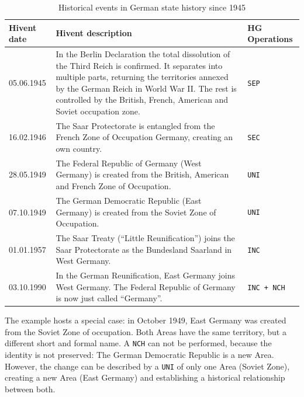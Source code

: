 \begin{table}[H]
\begin{center}
\begin{tabular}{l p{8.5cm} l}
  \toprule
  Hivent date & Hivent description & HG Operations \\
  \midrule

    05.06.1945
  & \footnotesize{In the Berlin Declaration the total dissolution of the Third Reich is confirmed. It separates into multiple parts, returning the territories annexed by the German Reich in World War II. The rest is controlled by the British, French, American and Soviet occupation zone.}
  & \texttt{SEP} \\

    16.02.1946
  & \footnotesize{The Saar Protectorate is entangled from the French Zone of Occupation Germany, creating an own country.}
  & \texttt{SEC} \\

    28.05.1949
  & \footnotesize{The Federal Republic of Germany (West Germany) is created from the British, American and French Zone of Occupation.}
  & \texttt{UNI} \\

    07.10.1949
  & \footnotesize{The German Democratic Republic (East Germany) is created from the Soviet Zone of Occupation.}
  & \texttt{UNI} \\

    01.01.1957
  & \footnotesize{The Saar Treaty (``Little Reunification'') joins the Saar Protectorate as the Bundesland Saarland in West Germany.}
  & \texttt{INC} \\

    03.10.1990
  & \footnotesize{In the German Reunification, East Germany joins West Germany. The Federal Republic of Germany is now just called ``Germany''.}
  & \texttt{INC + NCH} \\

  \bottomrule
\end{tabular}
\caption{Historical events in German state history since 1945}
\label{tab:german_history_since_1945}
\end{center}
\end{table}

The example hosts a special case: in October 1949, East Germany was created from the Soviet Zone of occupation. Both Areas have the same territory, but a different short and formal name. A \texttt{NCH} can not be performed, because the identity is not preserved: The German Democratic Republic is a new Area. However, the change can be described by a \texttt{UNI} of only one Area (Soviet Zone), creating a new Area (East Germany) and establishing a historical relationship between both.

